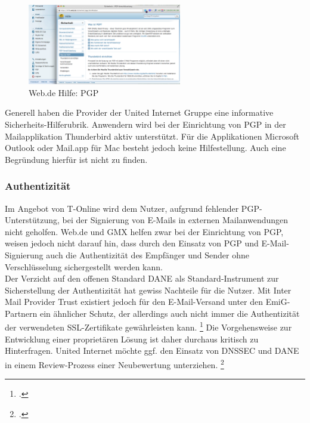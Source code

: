 \documentclass  [paper=a4,
				fontsize=12pt,
				listof=totoc,
				bibliography=totoc
				]{scrreprt}
\begin{document}
			\begin{figure} %
				\vspace{-12pt}
				\centering
				\includegraphics[width=0.6\textwidth]{images/Web-de_Hilfe_PGP}
				\caption[Web.de PGP]{Web.de Hilfe: PGP} 
				\label{fig:Web-de_Hilfe_PGP} %
				\vspace{-24pt}
			\end{figure}
			Generell haben die Provider der United Internet Gruppe eine informative Sicherheits-Hilferubrik.
			Anwendern wird bei der Einrichtung von PGP in der Mailapplikation Thunderbird aktiv unterstützt.
			Für die Applikationen Microsoft Outlook oder Mail.app für Mac besteht jedoch keine Hilfestellung.
			Auch eine Begründung hierfür ist nicht zu finden.
		\subsubsection{Authentizität}
		\label{subsubsec:emig-auth}	
			Im Angebot von T-Online wird dem Nutzer, aufgrund fehlender PGP-Unterstützung, bei der Signierung von E-Mails in externen Mailanwendungen nicht geholfen. 
			Web.de und GMX helfen zwar bei der Einrichtung von PGP, weisen jedoch nicht darauf hin, dass durch den Einsatz von PGP und E-Mail-Signierung auch die Authentizität des Empfänger und Sender ohne Verschlüsselung sichergestellt werden kann. \\
			Der Verzicht auf den offenen Standard DANE als Standard-Instrument zur Sicherstellung der Authentizität hat gewiss Nachteile für die Nutzer. 
			Mit Inter Mail Provider Trust existiert jedoch für den E-Mail-Versand unter den EmiG-Partnern ein ähnlicher Schutz, der allerdings auch nicht immer die Authentizität der verwendeten SSL-Zertifikate gewährleisten kann.
			\footcite[Vgl.][]{Zivadino14-1}
			Die Vorgehensweise zur Entwicklung einer proprietären Lösung ist daher durchaus kritisch zu Hinterfragen. 
			United Internet möchte ggf. den Einsatz von DNSSEC und DANE in einem Review-Prozess einer Neubewertung unterziehen.
			\footcite[Vgl.][]{Zivadino14-2}
\end{document}
